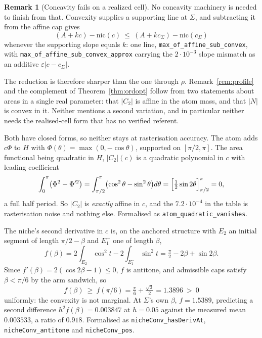 \documentclass[11pt]{article}
\theoremstyle{definition}
\newtheorem{remark}[theorem]{Remark}
\newcommand{\Sig}{\Sigma}
\begin{document}
\begin{remark}[Concavity fails on a realized cell]
No concavity machinery is needed to finish from that. Convexity supplies a supporting line
at $\Sig$, and subtracting it from the affine cap gives
\[
  (A+kc)-\mathrm{nic}(c)\ \le\ (A+kc_\Sig)-\mathrm{nic}(c_\Sig)
\]
whenever the supporting slope equals $k$: one line, \texttt{max\_of\_affine\_sub\_convex},
with \texttt{max\_of\_affine\_sub\_convex\_approx} carrying the $2\cdot10^{-3}$ slope
mismatch as an additive $\varepsilon|c-c_\Sig|$.

The reduction is therefore sharper than the one through $\rho$. Remark~\ref{rem:profile}
and the complement of Theorem~\ref{thm:ordopt} follow from two statements about areas in a
single real parameter: that $|C_2|$ is affine in the atom mass, and that $|N|$ is convex in
it. Neither mentions a second variation, and in particular neither needs the realised-cell
form that has no verified referent.

Both have closed forms, so neither stays at rasterisation accuracy. The atom adds
$c\Phi$ to $H$ with $\Phi(\theta)=\max(0,-\cos\theta)$, supported on $[\pi/2,\pi]$. The area
functional being quadratic in $H$, $|C_2|(c)$ is a quadratic polynomial in $c$ with leading
coefficient
\[
  \int_0^\pi\bigl(\Phi^2-\Phi'^2\bigr)
  =\int_{\pi/2}^\pi\bigl(\cos^2\theta-\sin^2\theta\bigr)d\theta
  =\Bigl[\tfrac12\sin2\theta\Bigr]_{\pi/2}^{\pi}=0 ,
\]
a full half period. So $|C_2|$ is \emph{exactly} affine in $c$, and the $7.2\cdot10^{-4}$
in the table is rasterisation noise and nothing else. Formalised as
\texttt{atom\_quadratic\_vanishes}.

The niche's second derivative in $c$ is, on the anchored structure with $E_2$ an initial
segment of length $\pi/2-\beta$ and $E_1^-$ one of length $\beta$,
\[
  f(\beta)=2\!\int_{E_2}\!\cos^2 t-2\!\int_{E_1^-}\!\sin^2 t
   =\tfrac\pi2-2\beta+\sin2\beta .
\]
Since $f'(\beta)=2(\cos2\beta-1)\le0$, $f$ is antitone, and admissible caps satisfy
$\beta<\pi/6$ by the arm sandwich, so
\[
  f(\beta)\ \ge\ f(\pi/6)=\tfrac\pi6+\tfrac{\sqrt3}2=1.3896\ >\ 0
\]
uniformly: the convexity is not marginal. At $\Sig$'s own $\beta$, $f=1.5389$, predicting a
second difference $h^2f(\beta)=0.003847$ at $h=0.05$ against the measured mean $0.003533$,
a ratio of $0.918$. Formalised as \texttt{nicheConv\_hasDerivAt},
\texttt{nicheConv\_antitone} and \texttt{nicheConv\_pos}.


\end{remark}
\end{document}
